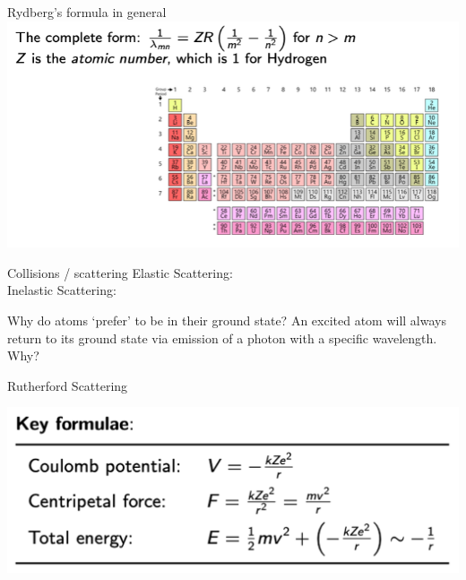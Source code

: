  \begin{frame}{Rydberg's formula in general}
\small
\includegraphics[scale=0.4]{spec9}

\end{frame}



 \begin{frame}{Collisions / scattering}
\small
Elastic Scattering:\\[10ex]

Inelastic Scattering:\\[10ex]



\end{frame}

 \begin{frame}{Why do atoms `prefer' to be in their ground state?}
\small
An excited atom will always return to its ground state via emission of a photon with a specific wavelength. Why?\\[25ex]



\end{frame}



 \begin{frame}{Rutherford Scattering}
\small


\includegraphics[scale=0.4]{ruth-form}

\end{frame}


